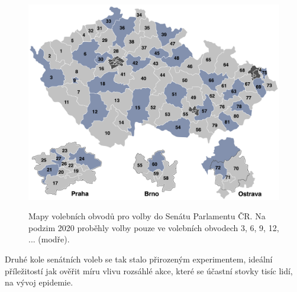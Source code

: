 \begin{figure}
    \begin{center}
    \includegraphics[scale=0.065]{okrsky_v3.png}
    \label{fig:senate_map}
    \end{center}
    \smallskip
    \caption{Mapy volebních obvodů pro volby do Senátu Parlamentu ČR. Na podzim 2020 proběhly volby pouze ve volebních obvodech 3, 6, 9, 12, ... (modře).}
    \end{figure}

Druhé kole senátních voleb se tak  stalo přirozeným experimentem, ideální příležitostí jak ověřit míru vlivu rozsáhlé akce, které se účastní stovky tisíc lidí, na vývoj epidemie.

